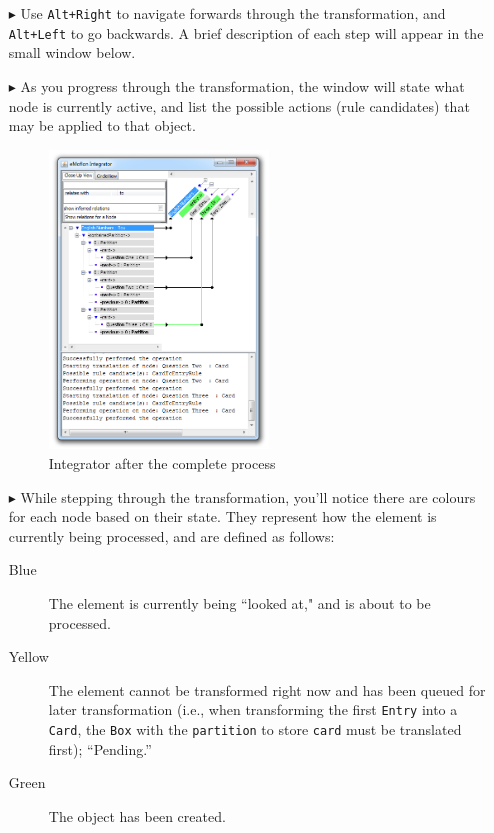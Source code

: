 \begin{itemize}
\item[$\blacktriangleright$]  Use \texttt{Alt+Right} to navigate forwards through the transformation, and \texttt{Alt+Left} to go backwards. A brief description
of each step will appear in the small window below.

\item[$\blacktriangleright$] As you progress through the transformation, the window will state what node is currently active, and list the possible actions
(rule candidates) that may be applied to that object. 

\vspace{0.5cm}

\begin{figure}[h!]
\begin{center}
  \includegraphics[width=0.55\textwidth]{eclipse_integratorPerformed}
  \caption{Integrator after the complete process}
  \label{eclipse:integrator_after_protocol}
\end{center}
\end{figure} 

\item[$\blacktriangleright$] While stepping through the transformation, you'll notice there are colours for each node based on their state. They represent how
the element is currently being processed, and are defined as follows:

\begin{description}
  \item[Blue] The element is currently being ``looked at," and is about to be processed.

  \item[Yellow] The element cannot be transformed right now and has been queued for later transformation (i.e., when transforming the first
  \texttt{Entry} into a \texttt{Card}, the \texttt{Box} with the \texttt{partition} to store \texttt{card} must be translated first); ``Pending.''
  
  \item[Green] The object has been created.

\end{description}

\end{itemize}
